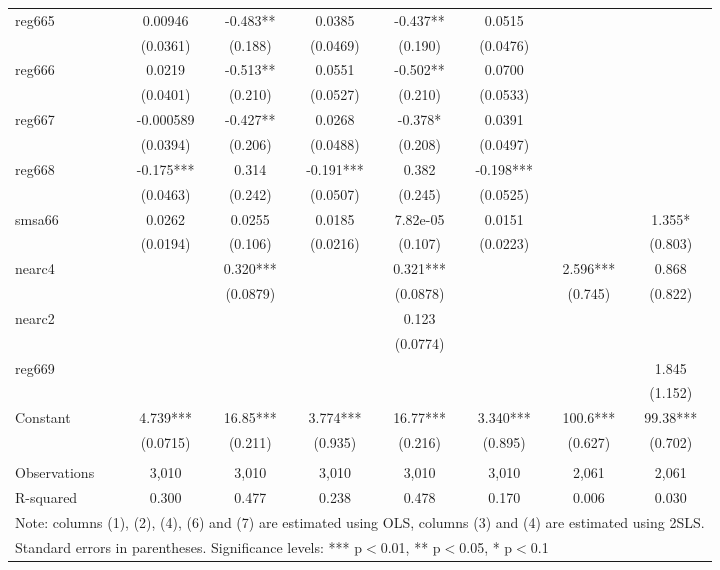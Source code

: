 \documentclass[a4paper, 12pt, twoside]{article}
\begin{document}
\begin{table*}
\begin{center}
\begin{tabular}{lccccccc}
reg665 & 0.00946 & -0.483** & 0.0385 & -0.437** & 0.0515 &  &  \\
 & (0.0361) & (0.188) & (0.0469) & (0.190) & (0.0476) &  &  \\
reg666 & 0.0219 & -0.513** & 0.0551 & -0.502** & 0.0700 &  &  \\
 & (0.0401) & (0.210) & (0.0527) & (0.210) & (0.0533) &  &  \\
reg667 & -0.000589 & -0.427** & 0.0268 & -0.378* & 0.0391 &  &  \\
 & (0.0394) & (0.206) & (0.0488) & (0.208) & (0.0497) &  &  \\
reg668 & -0.175*** & 0.314 & -0.191*** & 0.382 & -0.198*** &  &  \\
 & (0.0463) & (0.242) & (0.0507) & (0.245) & (0.0525) &  &  \\
smsa66 & 0.0262 & 0.0255 & 0.0185 & 7.82e-05 & 0.0151 &  & 1.355* \\
 & (0.0194) & (0.106) & (0.0216) & (0.107) & (0.0223) &  & (0.803) \\
nearc4 &  & 0.320*** &  & 0.321*** &  & 2.596*** & 0.868 \\
 &  & (0.0879) &  & (0.0878) &  & (0.745) & (0.822) \\
nearc2 &  &  &  & 0.123 &  &  &  \\
 &  &  &  & (0.0774) &  &  &  \\
reg669 &  &  &  &  &  &  & 1.845 \\
 &  &  &  &  &  &  & (1.152) \\
Constant & 4.739*** & 16.85*** & 3.774*** & 16.77*** & 3.340*** & 100.6*** & 99.38*** \\
 & (0.0715) & (0.211) & (0.935) & (0.216) & (0.895) & (0.627) & (0.702) \\
 &  &  &  &  &  &  &  \\
Observations & 3,010 & 3,010 & 3,010 & 3,010 & 3,010 & 2,061 & 2,061 \\
 R-squared & 0.300 & 0.477 & 0.238 & 0.478 & 0.170 & 0.006 & 0.030 \\ \hline
\multicolumn{8}{l}{\footnotesize{Note: columns (1), (2), (4), (6) and (7) are estimated using OLS, columns (3) and (4) are estimated using 2SLS. \par}} \\
\multicolumn{8}{l}{\footnotesize{Standard errors in parentheses. Significance levels: *** p$<$0.01, ** p$<$0.05, * p$<$0.1 \par}} \\
\end{tabular}
\end{center}
\end{table*}
\end{document}
